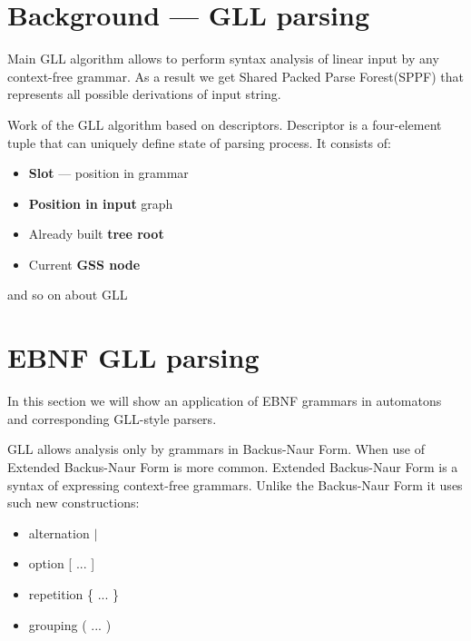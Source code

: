 \documentclass[runningheads,a4paper]{llncs}
\begin{document}






\section{Background --- GLL parsing}%

Main GLL algorithm\cite{scott2010gll} allows to perform syntax analysis of linear input by any context-free 
grammar. As a result we get Shared Packed Parse Forest(SPPF) that represents all possible derivations of input string.

Work of the GLL algorithm based on descriptors. Descriptor is a four-element tuple that can uniquely define state 
of parsing process. It consists of:
\begin{itemize}
    \item \textbf{Slot} --- position in grammar
    \item \textbf{Position in input} graph
    \item Already built \textbf{tree root}
    \item Current \textbf{GSS node}
\end{itemize}

and so on about GLL



\section{EBNF GLL parsing}%

In this section we will show an application of EBNF grammars in automatons and corresponding GLL-style parsers.

GLL allows analysis only by grammars in Backus-Naur Form. When use of Extended Backus-Naur Form is more common.
Extended Backus-Naur Form is a syntax of expressing context-free grammars. Unlike the Backus-Naur Form it 
uses such new constructions:
\begin{itemize}
    \item alternation $\mid$
    \item option [ ... ]
    \item repetition \{ ... \}
    \item grouping ( ... )
\end{itemize}
\end{document}
